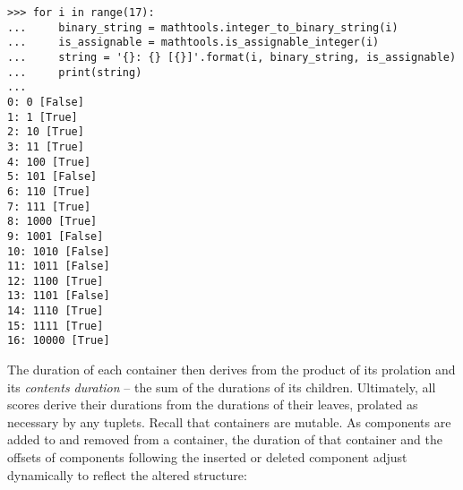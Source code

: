 \begin{comment}
<abjad>
for i in range(17):
    binary_string = mathtools.integer_to_binary_string(i)
    is_assignable = mathtools.is_assignable_integer(i)
    string = '{}: {} [{}]'.format(i, binary_string, is_assignable)
    print(string)

</abjad>
\end{comment}

\begin{abjadbookoutput}
\begin{singlespacing}
\vspace{-0.5\baselineskip}
\begin{verbatim}
>>> for i in range(17):
...     binary_string = mathtools.integer_to_binary_string(i)
...     is_assignable = mathtools.is_assignable_integer(i)
...     string = '{}: {} [{}]'.format(i, binary_string, is_assignable)
...     print(string)
...
0: 0 [False]
1: 1 [True]
2: 10 [True]
3: 11 [True]
4: 100 [True]
5: 101 [False]
6: 110 [True]
7: 111 [True]
8: 1000 [True]
9: 1001 [False]
10: 1010 [False]
11: 1011 [False]
12: 1100 [True]
13: 1101 [False]
14: 1110 [True]
15: 1111 [True]
16: 10000 [True]
\end{verbatim}
\end{singlespacing}
\end{abjadbookoutput}

\noindent The duration of each container then derives from the product of its
prolation and its \emph{contents duration} -- the sum of the durations of its
children. Ultimately, all scores derive their durations from the durations of
their leaves, prolated as necessary by any tuplets. Recall that containers are
mutable. As components are added to and removed from a container, the duration
of that container and the offsets of components following the inserted or
deleted component adjust dynamically to reflect the altered structure:

\begin{comment}
<abjad>
staff = Staff("c'4 d'4 e'4 f'4")
show(staff)
inspect_(staff).get_duration()
for leaf in staff:
    offset = inspect_(leaf).get_timespan().start_offset
    print(offset, leaf)

</abjad>
\end{comment}

